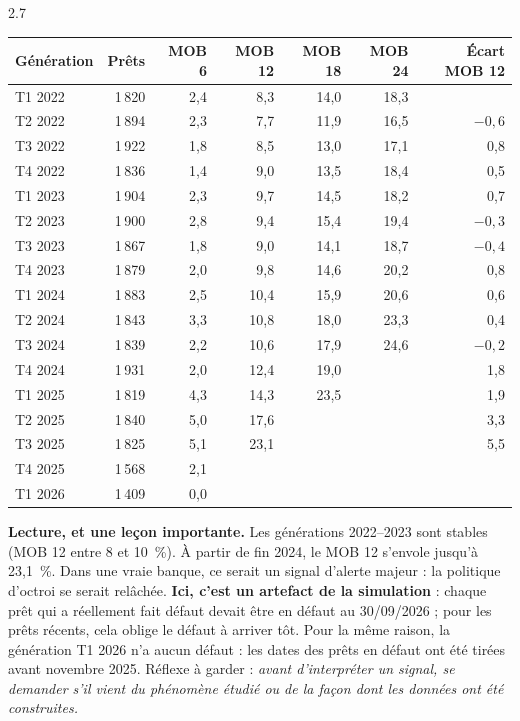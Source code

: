 \begin{correction}{2.7}
\begin{resultat}
\begin{center}\small
\begin{tabular}{@{}lrrrrrr@{}}
\toprule
Génération & Prêts & MOB 6 & MOB 12 & MOB 18 & MOB 24 & Écart MOB 12 \\
\midrule
T1 2022 & 1\,820 & 2,4 & 8,3 & 14,0 & 18,3 & \\
T2 2022 & 1\,894 & 2,3 & 7,7 & 11,9 & 16,5 & $-0{,}6$ \\
T3 2022 & 1\,922 & 1,8 & 8,5 & 13,0 & 17,1 & 0,8 \\
T4 2022 & 1\,836 & 1,4 & 9,0 & 13,5 & 18,4 & 0,5 \\
T1 2023 & 1\,904 & 2,3 & 9,7 & 14,5 & 18,2 & 0,7 \\
T2 2023 & 1\,900 & 2,8 & 9,4 & 15,4 & 19,4 & $-0{,}3$ \\
T3 2023 & 1\,867 & 1,8 & 9,0 & 14,1 & 18,7 & $-0{,}4$ \\
T4 2023 & 1\,879 & 2,0 & 9,8 & 14,6 & 20,2 & 0,8 \\
T1 2024 & 1\,883 & 2,5 & 10,4 & 15,9 & 20,6 & 0,6 \\
T2 2024 & 1\,843 & 3,3 & 10,8 & 18,0 & 23,3 & 0,4 \\
T3 2024 & 1\,839 & 2,2 & 10,6 & 17,9 & 24,6 & $-0{,}2$ \\
T4 2024 & 1\,931 & 2,0 & 12,4 & 19,0 & & 1,8 \\
T1 2025 & 1\,819 & 4,3 & 14,3 & 23,5 & & 1,9 \\
\rowcolor{rougeFond} T2 2025 & 1\,840 & 5,0 & 17,6 & & & 3,3 \\
\rowcolor{rougeFond} T3 2025 & 1\,825 & 5,1 & 23,1 & & & 5,5 \\
T4 2025 & 1\,568 & 2,1 & & & & \\
T1 2026 & 1\,409 & 0,0 & & & & \\
\bottomrule
\end{tabular}
\end{center}
\end{resultat}

\textbf{Lecture, et une leçon importante.} Les générations 2022--2023 sont stables (MOB 12 entre 8 et
10~\%). À partir de fin 2024, le MOB 12 s'envole jusqu'à 23,1~\%. Dans une vraie banque, ce serait un
signal d'alerte majeur : la politique d'octroi se serait relâchée. \textbf{Ici, c'est un artefact de la
simulation} : chaque prêt qui a réellement fait défaut devait être en défaut au 30/09/2026 ; pour les
prêts récents, cela oblige le défaut à arriver tôt. Pour la même raison, la génération T1 2026 n'a aucun
défaut : les dates des prêts en défaut ont été tirées avant novembre 2025. Réflexe à garder :
\emph{avant d'interpréter un signal, se demander s'il vient du phénomène étudié ou de la façon dont les
données ont été construites.}
\end{correction}

